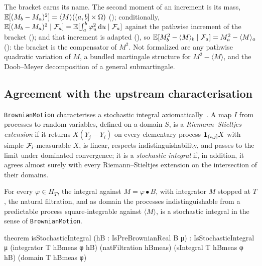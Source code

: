 \documentclass[11pt]{article}
\newcommand{\HT}{H_T}
\newcommand{\bulletB}{\mathbin{\bullet}}
\begin{document}
The bracket earns its name. The second moment of an increment is its mass,
$\mathbb{E}[(M_b-M_a)^2]=\langle M\rangle((a,b]\times\Omega)$ (); conditionally,
$\mathbb{E}[(M_b-M_a)^2\mid\mathcal{F}_a]=\mathbb{E}[\int_a^b\varphi_u^2\,\mathrm{d} u\mid\mathcal{F}_a]$ against the pathwise increment of the bracket
(); and that increment is adapted (), so
$\mathbb{E}[M_b^2-\langle M\rangle_b\mid\mathcal{F}_a]=M_a^2-\langle M\rangle_a$ (): the bracket is the
compensator of $M^2$. Not formalized are any
pathwise quadratic variation of $M$, a bundled martingale structure for $M^2-\langle M\rangle$, and the Doob--Meyer
decomposition of a general submartingale.

\subsection{Agreement with the upstream characterisation}\label{sec:characterisation}
\texttt{BrownianMotion} characterises a stochastic integral axiomatically~\cite{BrownianMotionRepo}. A map $I$ from
processes to random variables, defined on a domain $S$, is a \emph{Riemann--Stieltjes extension} if it returns
$X(Y_j-Y_i)$ on every elementary process $\mathbf{1}_{(i,j]}X$ with simple $\mathcal{F}_i$-measurable $X$, is linear, respects
indistinguishability, and passes to the limit under dominated convergence; it is a \emph{stochastic integral} if,
in addition, it agrees almost surely with every Riemann--Stieltjes extension on the intersection of their domains.

\begin{theorem}\label{thm:char}
For every $\varphi\in\HT$, the integral against $M=\varphi\bulletB B$, with integrator $M$ stopped at $T$, the natural
filtration, and as domain the processes indistinguishable from a predictable process square-integrable against
$\langle M\rangle$, is a stochastic integral in the sense of \texttt{BrownianMotion}.
\end{theorem}

\begin{leancode}[caption={The characterisation (\texttt{Foundations/StochasticIntegralCharacterisation}).},label=lst:char]
theorem isStochasticIntegral (hB : IsPreBrownianReal B μ) :
    IsStochasticIntegral μ (integrator T hBmeas φ hB) (natFiltration hBmeas)
      (sIntegral T hBmeas φ hB) (domain T hBmeas φ)
\end{leancode}
\end{document}
